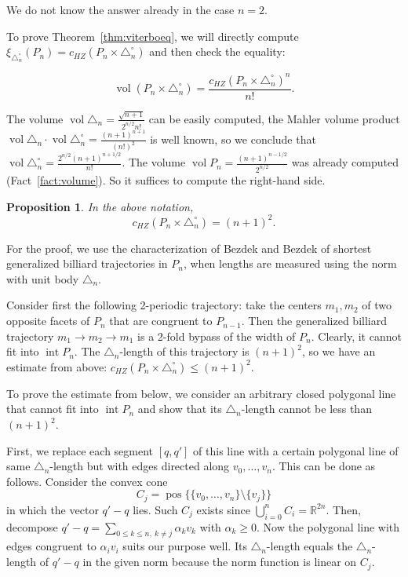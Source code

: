 \documentclass[12pt,a4paper,oneside]{amsart}
\newtheorem{proposition}[theorem]{Proposition}
\theoremstyle{definition}
\theoremstyle{remark}
\numberwithin{equation}{section}
\DeclareMathOperator{\volu}{vol}
\DeclareMathOperator{\inte}{int}
\DeclareMathOperator{\pos}{pos}
\begin{document}
We do not know the answer already in the case $n=2$.

To prove Theorem~\ref{thm:viterboeq}, we will directly compute $\xi_{\triangle_n^\circ}(P_n) = c_{HZ}(P_n \times \triangle_n^\circ)$ and then check the equality:

$$
\volu (P_n \times \triangle_n^\circ) = \frac{c_{HZ}(P_n \times \triangle_n^\circ)^n}{n!}.
$$

The volume $\volu \triangle_n = \frac{\sqrt{n+1}}{2^{n/2} n!}$ can be easily computed, the Mahler volume product $\volu \triangle_n \cdot \volu \triangle_n^\circ = \frac{(n+1)^{n+1}}{(n!)^2}$ is well known, so we conclude that $\volu \triangle_n^\circ = \frac{2^{n/2} (n+1)^{n+1/2}}{n!}$. The volume $\volu P_n = \frac{(n+1)^{n-1/2}}{2^{n/2}}$ was already computed (Fact~\ref{fact:volume}).
So it suffices to compute the right-hand side.

\begin{proposition}
\label{prop:capacity}
In the above notation,
$$
c_{HZ} (P_n \times \triangle_n^\circ) = (n+1)^2.
$$
\end{proposition}

For the proof, we use the characterization of Bezdek and Bezdek of shortest generalized billiard trajectories in $P_n$, when lengths are measured using the norm with unit body $\triangle_n$.

Consider first the following 2-periodic trajectory: take the centers $m_1, m_2$ of two opposite facets of $P_n$ that are congruent to $P_{n-1}$. Then the generalized billiard trajectory $m_1 \to m_2 \to m_1$ is a 2-fold bypass of the width of $P_n$. Clearly, it cannot fit into $\inte P_n$. The $\triangle_n$-length of this trajectory is $(n+1)^2$, so we have an estimate from above: $c_{HZ} (P_n \times \triangle_n^\circ) \le (n+1)^2$.

To prove the estimate from below, we consider an arbitrary closed polygonal line that cannot fit into $\inte P_n$ and show that its $\triangle_n$-length cannot be less than $(n+1)^2$.

First, we replace each segment $[q,q']$ of this line with a certain polygonal line of same $\triangle_n$-length but with edges directed along $v_0, \ldots, v_n$. This can be done as follows. Consider the convex cone
$$
C_j = \pos\{\{v_0, \ldots, v_n\} \setminus \{v_j\}\}
$$
in which the vector $q'-q$ lies. Such $C_j$ exists since $\bigcup\limits_{i=0}^n C_i = \mathbb{R}^{2n}$.
Then, decompose $q'-q = \sum\limits_{0\le k \le n, \ k\neq j} \alpha_k v_k$ with $\alpha_k \ge 0$. Now the polygonal line with edges congruent to $\alpha_i v_i$ suits our purpose well. Its $\triangle_n$-length equals the $\triangle_n$-length of $q'-q$ in the given norm because the norm function is linear on $C_j$.
\end{document}
